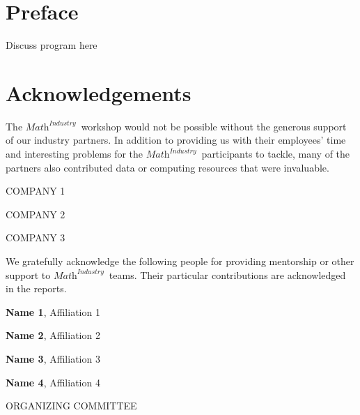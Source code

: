 \documentclass[11pt]{report}
\begin{document}
\newcommand{\mtopi}{$\textit{Math}^\textit{Industry}$~}
\newcommand{\person}[2]{\textbf{#1}, #2}
\sectionfont{\centering\sc\MakeLowercase}



\section*{Preface}
    Discuss program here

\newpage

\section*{Acknowledgements}
The \mtopi workshop would not be possible without
the generous support of our industry partners. In addition to providing us with
their employees' time and interesting problems for the
\mtopi participants to tackle, many of the partners
also contributed data or computing resources that were invaluable.

\noindent\hrulefill

\begin{multicols}{2}
    \begin{flushleft}
        \uppercase{Company 1}
        
        \uppercase{Company 2}
     
        \uppercase{Company 3}
    \end{flushleft}
 \end{multicols}

\noindent\hrulefill

We gratefully acknowledge the following people for providing mentorship or
other support to \mtopi teams. Their particular contributions are acknowledged
in the reports.

\noindent\hrulefill

\begin{multicols}{2}
    \begin{flushleft} 
        \person{Name 1}{Affiliation 1}

        \person{Name 2}{Affiliation 2}

        \person{Name 3}{Affiliation 3}

        \person{Name 4}{Affiliation 4}
    \end{flushleft}
\end{multicols}


\begin{center} ORGANIZING COMMITTEE \end{center}
\end{document}
